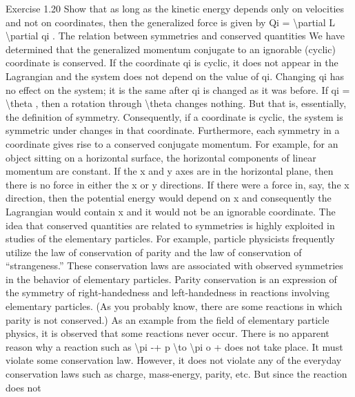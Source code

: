 \begin{exercise}
Exercise 1.20 Show that as long as the kinetic energy depends only on
velocities and not on coordinates, then the generalized force is given by
Qi = \textbackslash{}partial L
\textbackslash{}partial qi .
The relation between symmetries and conserved quantities
We have determined that the generalized momentum conjugate to an ignorable (cyclic) coordinate is conserved. If the coordinate qi is cyclic, it does not
appear in the Lagrangian and the system does not depend on the value of qi.
Changing qi has no effect on the system; it is the same after qi is changed as it
was before. If qi = \textbackslash{}theta , then a rotation through \textbackslash{}theta  changes nothing. But that is,
essentially, the definition of symmetry. Consequently, if a coordinate is cyclic,
the system is symmetric under changes in that coordinate. Furthermore, each
symmetry in a coordinate gives rise to a conserved conjugate momentum. For
example, for an object sitting on a horizontal surface, the horizontal components of linear momentum are constant. If the x and y axes are in the horizontal
plane, then there is no force in either the x or y directions. If there were a force
in, say, the x direction, then the potential energy would depend on x and consequently the Lagrangian would contain x and it would not be an ignorable
coordinate.
The idea that conserved quantities are related to symmetries is highly
exploited in studies of the elementary particles. For example, particle physicists frequently utilize the law of conservation of parity and the law of conservation of ``strangeness.'' These conservation laws are associated with observed
symmetries in the behavior of elementary particles. Parity conservation is an
expression of the symmetry of right-handedness and left-handedness in reactions involving elementary particles. (As you probably know, there are some
reactions in which parity is not conserved.)
As an example from the field of elementary particle physics, it is observed
that some reactions never occur. There is no apparent reason why a reaction
such as \textbackslash{}pi -+ p \textbackslash{}to \textbackslash{}pi o +  does not take place. It must violate some conservation law. However, it does not violate any of the everyday conservation
laws such as charge, mass-energy, parity, etc. But since the reaction does not


\end{exercise}
